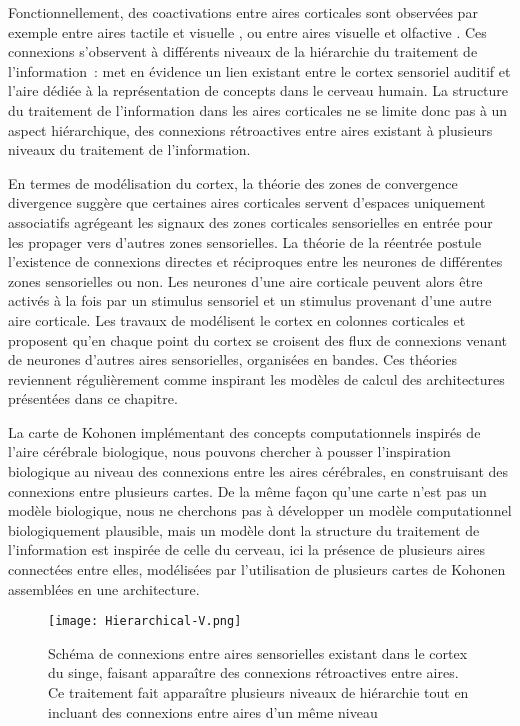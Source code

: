 \documentclass[../main]{subfiles}
\begin{document}
Fonctionnellement, des coactivations entre aires corticales sont observées par exemple entre aires tactile et visuelle \parencite{Sathian2002FeelingWT}, ou entre aires visuelle et olfactive \parencite{Gonzlez2006ReadingCA}.
Ces connexions s'observent à différents niveaux de la hiérarchie du traitement de l'information~: \cite{Kiefer2008TheSO} met en évidence un lien existant entre le cortex sensoriel auditif et l'aire dédiée à la représentation de concepts dans le cerveau humain.
La structure du traitement de l'information dans les aires corticales ne se limite donc pas à un aspect hiérarchique, des connexions rétroactives entre aires existant à plusieurs niveaux du traitement de l'information.

En termes de modélisation du cortex, la théorie des zones de convergence divergence \parencite{damasio_time-locked_1989} suggère que certaines aires corticales servent d'espaces uniquement associatifs agrégeant les signaux des zones corticales sensorielles en entrée pour les propager vers d'autres zones sensorielles. 
La théorie de la réentrée \parencite{Edelman1982GroupSA} postule l'existence de connexions directes et réciproques entre les neurones de différentes zones sensorielles ou non. Les neurones d'une aire corticale peuvent alors être activés à la fois par un stimulus sensoriel et un stimulus provenant d'une autre aire corticale.
Les travaux de \cite{Burnod1989AnAN} modélisent le cortex en colonnes corticales et proposent qu'en chaque point du cortex se croisent des flux de connexions venant de neurones d'autres aires sensorielles, organisées en bandes. Ces théories reviennent régulièrement comme inspirant les modèles de calcul des architectures présentées dans ce chapitre.

La carte de Kohonen implémentant des concepts computationnels inspirés de l'aire cérébrale biologique, nous pouvons chercher à pousser l'inspiration biologique au niveau des connexions entre les aires cérébrales, en construisant des connexions entre plusieurs cartes.
De la même façon qu'une carte n'est pas un modèle biologique, nous ne cherchons pas à développer un modèle computationnel biologiquement plausible, mais un modèle dont la structure du traitement de l'information est inspirée de celle du cerveau, ici la présence de plusieurs aires connectées entre elles, modélisées par l'utilisation de plusieurs cartes de Kohonen assemblées en une architecture.

\begin{figure}
    \centering
    \texttt{[image: Hierarchical-V.png]}
    \caption{Schéma de connexions entre aires sensorielles existant dans le cortex du singe, faisant apparaître des connexions rétroactives entre aires. Ce traitement fait apparaître plusieurs niveaux de hiérarchie tout en incluant des connexions entre aires d'un même niveau \parencite{primate_cortex_91}\label{fig:primate}}
\end{figure}
\end{document}
